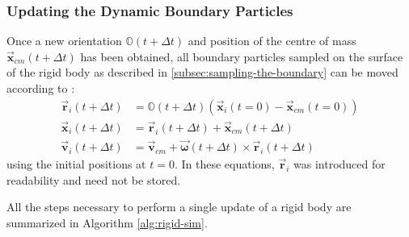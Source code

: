 \documentclass[oneside, a4paper]{book}
\newcommand\vek[1]{\vec{\bm{#1}}}
\newcommand\br[1]{\left(#1\right)}
\begin{document}
    \subsubsection{Updating the Dynamic Boundary Particles}
    Once a new orientation $\mathds{O}\br{t+\Delta t}$ and position of the centre of mass $\vek{x}_{cm}\br{t+\Delta t}$ has been obtained, all boundary particles sampled on the surface of the rigid body as described in \autoref{subsec:sampling-the-boundary} can be moved according to \autocite{physically-based-rigids}:
    \begin{align}
      \vek{r}_i\br{t+\Delta t} &= \mathds{O}\br{t+\Delta t} \br{\vek{x}_i\br{t=0} - \vek{x}_{cm}\br{t=0}}\\
      \vek{x}_i\br{t+\Delta t} &= \vek{r}_i\br{t+\Delta t} + \vek{x}_{cm}\br{t+\Delta t}\label{eq:rigid-update-particle-x}\\
      \vek{v}_i\br{t+\Delta t} &= \vek{v}_{cm} + \vek{\omega}\br{t+\Delta t} \times \vek{r}_i\br{t+\Delta t}\label{eq:rigid-update-particle-v}
    \end{align}
    using the initial positions at $t=0$. In these equations, $\vek{r}_i$ was introduced for readability and need not be stored. 

    All the steps necessary to perform a single update of a rigid body are summarized in Algorithm \ref{alg:rigid-sim}.
\end{document}

